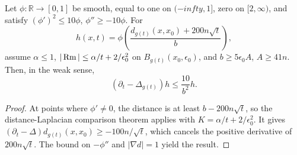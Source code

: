 \begin{lemma}
\label{lem:chow-iii-time-dependent-cutoff}

Let \(\phi\colon\mathbb R\to[0,1]\) be smooth, equal to one on
\((-infty,1]\), zero on \([2,\infty)\), and satisfy
\((\phi')^2\le10\phi\), \(\phi''\ge-10\phi\).  For
\[
 h(x,t)=\phi\!\left(\frac{d_{g(t)}(x,x_0)+200n\sqrt t}{b}\right),
\]
assume \(\alpha\le1\), \(|\operatorname{Rm}|\le\alpha/t+2/\epsilon_0^2\) on
\(B_{g(t)}(x_0,\epsilon_0)\), and \(b\ge5\epsilon_0A\), \(A\ge41n\).  Then,
in the weak sense,
\[
 (\partial_t-\Delta_{g(t)})h\le\frac{10}{b^2}h.
\]
\end{lemma}
\begin{proof}
\sketch At points where \(\phi'\ne0\), the distance is at least \(b-200n\sqrt t\),
so the distance-Laplacian comparison theorem applies with
\(K=\alpha/t+2/\epsilon_0^2\).  It gives
\((\partial_t-\Delta)d_{g(t)}(x,x_0)\ge-100n/\sqrt t\), which cancels the
positive derivative of \(200n\sqrt t\).  The bound on \(-\phi''\) and
\(|\nabla d|=1\) yield the result.
\end{proof}

